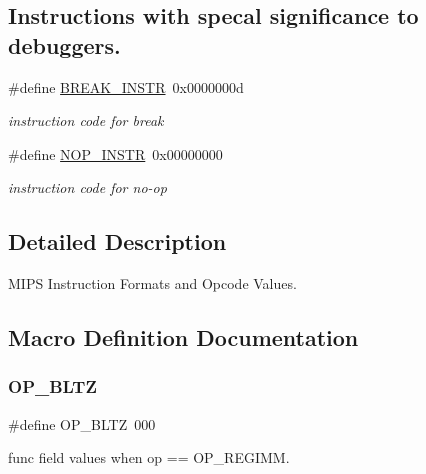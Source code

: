 \subsection*{Instructions with specal significance to debuggers.}
\begin{DoxyCompactItemize}
\item 
\mbox{\label{group__mips__ops_ga59f76faa132b25121f7c6e1eecd9eafb}} 
\#define \mbox{\hyperlink{group__mips__ops_ga59f76faa132b25121f7c6e1eecd9eafb}{B\+R\+E\+A\+K\+\_\+\+I\+N\+S\+TR}}~0x0000000d
\begin{DoxyCompactList}\small\item\em instruction code for break \end{DoxyCompactList}\item 
\mbox{\label{group__mips__ops_ga4f9f0ea265158cb2d0e33f6df323a9c5}} 
\#define \mbox{\hyperlink{group__mips__ops_ga4f9f0ea265158cb2d0e33f6df323a9c5}{N\+O\+P\+\_\+\+I\+N\+S\+TR}}~0x00000000
\begin{DoxyCompactList}\small\item\em instruction code for no-\/op \end{DoxyCompactList}\end{DoxyCompactItemize}


\subsection{Detailed Description}
M\+I\+PS Instruction Formats and Opcode Values. 



\subsection{Macro Definition Documentation}
\mbox{\label{group__mips__ops_ga5a37e5515123565e6e9eab363be791c2}} 
\subsubsection{\texorpdfstring{OP\_BLTZ}{OP\_BLTZ}}
{\footnotesize\ttfamily \#define O\+P\+\_\+\+B\+L\+TZ~000}

\textquotesingle{}func\textquotesingle{} field values when \textquotesingle{}op\textquotesingle{} == O\+P\+\_\+\+R\+E\+G\+I\+MM. 